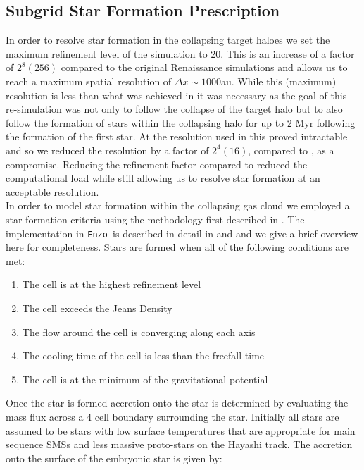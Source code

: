 \documentclass[graphics, twocolumn, usenatbib]{mn2e}
\newcommand{\enzo}{\texttt{Enzo~}}
\begin{document}
 \subsection{Subgrid Star Formation Prescription} \label{Sec:StarFormation}
 \indent In order to resolve star formation in the collapsing target haloes we set the maximum refinement level of the simulation to 20. This is an increase of a factor of $2^8 (256)$ compared to the  original Renaissance simulations and allows us to reach a maximum spatial resolution of $\Delta x \sim 1000 $au. While this (maximum) resolution is less than what was achieved
 in \cite{Wise_2019} it was necessary as the goal of this re-simulation was not only to follow the collapse of the target halo but to also follow the formation of stars within the collapsing
 halo for up to 2 Myr following the formation of the first star. At the resolution used in
 \cite{Wise_2019} this proved intractable and so we reduced the
 resolution by a factor of $2^4 (16)$, compared to \cite{Wise_2019}, as a compromise. Reducing the refinement factor compared to \cite{Wise_2019} reduced the computational load while still allowing us to
 resolve star formation at an acceptable resolution. \\
 \indent In order to model star formation within the collapsing gas cloud we employed a star
 formation criteria using the methodology first described in \cite{Krumholz_2004}. The implementation
 in \enzo is described in detail in \cite{Regan_2018a} and \cite{Regan_2018b} and we give a
 brief overview here for completeness. Stars are formed when all of the following conditions are met:
\begin{enumerate}
\item The cell is at the highest refinement level
\item The cell exceeds the Jeans Density
\item The flow around the cell is converging along each axis
\item The cooling time of the cell is less than the freefall time
\item The cell is at the minimum of the gravitational potential
\end{enumerate}
Once the star is formed accretion onto the star is determined by evaluating the mass flux across
a 4 cell boundary surrounding the star. Initially all stars are assumed to be stars with low surface
temperatures that are appropriate for main sequence SMSs and less massive proto-stars on the
Hayashi track. The accretion onto the surface of the embryonic star is given by:
\end{document}
